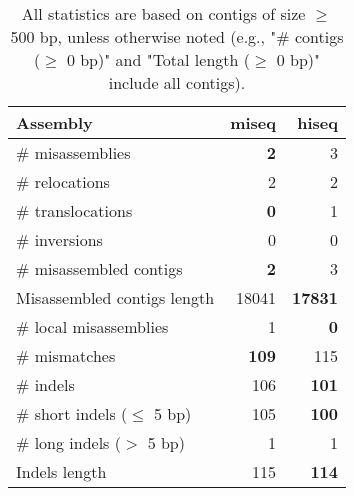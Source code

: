 \documentclass[12pt,a4paper]{article}
\begin{document}
\begin{table}[ht]
\begin{center}
\caption{All statistics are based on contigs of size $\geq$ 500 bp, unless otherwise noted (e.g., "\# contigs ($\geq$ 0 bp)" and "Total length ($\geq$ 0 bp)" include all contigs).}
\begin{tabular}{|l*{2}{|r}|}
\hline
Assembly & miseq & hiseq \\ \hline
\# misassemblies & {\bf 2} & 3 \\ \hline
\hspace{5mm}\# relocations & 2 & 2 \\ \hline
\hspace{5mm}\# translocations & {\bf 0} & 1 \\ \hline
\hspace{5mm}\# inversions & 0 & 0 \\ \hline
\# misassembled contigs & {\bf 2} & 3 \\ \hline
Misassembled contigs length & 18041 & {\bf 17831} \\ \hline
\# local misassemblies & 1 & {\bf 0} \\ \hline
\# mismatches & {\bf 109} & 115 \\ \hline
\# indels & 106 & {\bf 101} \\ \hline
\hspace{5mm}\# short indels ($\leq$ 5 bp) & 105 & {\bf 100} \\ \hline
\hspace{5mm}\# long indels ($>$ 5 bp) & 1 & 1 \\ \hline
Indels length & 115 & {\bf 114} \\ \hline
\end{tabular}
\end{center}
\end{table}
\end{document}
